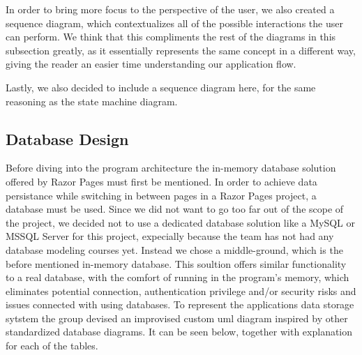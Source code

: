 \documentclass[12pt]{report}
\begin{document}
In order to bring more focus to the perspective of the user, we also created a sequence diagram, which contextualizes
all of the possible interactions the user can perform. We think that this compliments the rest of the diagrams in this subsection
greatly, as it essentially represents the same concept in a different way, giving the reader an easier time understanding our application flow.

Lastly, we also decided to include a sequence diagram here, for the same reasoning as the state machine diagram.








\subsection*{Database Design}
\label{sec:database}
Before diving into the program architecture the in-memory database solution offered by Razor Pages must first be mentioned.
In order to achieve data persistance while switching in between pages in a Razor Pages project, a database must be used. 
Since we did not want to go too far out of the scope of the project, we decided not to use a dedicated database solution
like a MySQL or MSSQL Server for this project, expecially because the team has not had any database modeling courses
yet. Instead we chose a middle-ground, which is the before mentioned in-memory database. This soultion offers similar functionality
to a real database, with the comfort of running in the program's memory, which eliminates potential connection, authentication
privilege and/or security risks and issues connected with using databases. To represent the applications data storage sytstem
the group devised an improvised custom uml diagram inspired by other standardized database diagrams. It can be seen below, together with
explanation for each of the tables.


\end{document}

